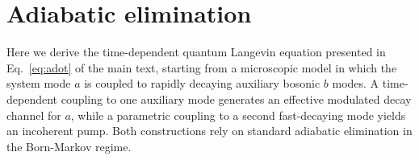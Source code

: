 \documentclass[a4paper,twocolumn,floatfix,10pt,superscriptaddress]%
{quantumarticle}
\newcommand{\mcl}[1]{\mathcal{#1}}
\begin{document}




\appendix
\section{Adiabatic elimination}
\label{app:AElimination}
Here we derive the time-dependent quantum Langevin equation presented in Eq.~\eqref{eq:adot} of the main text, starting from a microscopic model in which the system mode $a$ is coupled to rapidly decaying auxiliary bosonic $b$ modes. A time-dependent coupling to one auxiliary mode generates an effective modulated decay channel for $a$, while a parametric coupling to a second fast-decaying mode yields an incoherent pump. Both constructions rely on standard adiabatic elimination in the Born-Markov regime.
\end{document}
